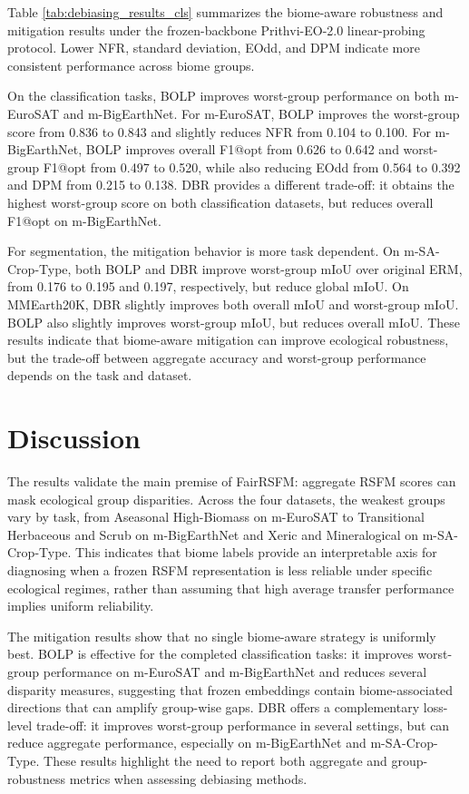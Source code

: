 \documentclass[10pt,twocolumn,letterpaper]{article}
\newcommand{\method}{FairRSFM\xspace}
\begin{document}
Table \ref{tab:debiasing_results_cls} summarizes the biome-aware robustness and mitigation results under the frozen-backbone Prithvi-EO-2.0 linear-probing protocol. Lower NFR, standard deviation, EOdd, and DPM indicate more consistent performance across biome groups.


On the classification tasks, BOLP improves worst-group performance on both m-EuroSAT and m-BigEarthNet. For m-EuroSAT, BOLP improves the worst-group score from 0.836 to 0.843 and slightly reduces NFR from 0.104 to 0.100. For m-BigEarthNet, BOLP improves overall F1@opt from 0.626 to 0.642 and worst-group F1@opt from 0.497 to 0.520, while also reducing EOdd from 0.564 to 0.392 and DPM from 0.215 to 0.138. DBR provides a different trade-off: it obtains the highest worst-group score on both classification datasets, but reduces overall F1@opt on m-BigEarthNet.

For segmentation, the mitigation behavior is more task dependent. On m-SA-Crop-Type, both BOLP and DBR improve worst-group mIoU over original ERM, from 0.176 to 0.195 and 0.197, respectively, but reduce global mIoU. On MMEarth20K, DBR slightly improves both overall mIoU and worst-group mIoU. BOLP also slightly improves worst-group mIoU, but reduces overall mIoU. These results indicate that biome-aware mitigation can improve ecological robustness, but the trade-off between aggregate accuracy and worst-group performance depends on the task and dataset.

\section{Discussion}

The results validate the main premise of \method: aggregate RSFM scores can mask ecological group disparities. Across the four datasets, the weakest groups vary by task, from Aseasonal High-Biomass on m-EuroSAT to Transitional Herbaceous and Scrub on m-BigEarthNet and Xeric and Mineralogical on m-SA-Crop-Type. This indicates that biome labels provide an interpretable axis for diagnosing when a frozen RSFM representation is less reliable under specific ecological regimes, rather than assuming that high average transfer performance implies uniform reliability.

The mitigation results show that no single biome-aware strategy is uniformly best. BOLP is effective for the completed classification tasks: it improves worst-group performance on m-EuroSAT and m-BigEarthNet and reduces several disparity measures, suggesting that frozen embeddings contain biome-associated directions that can amplify group-wise gaps. DBR offers a complementary loss-level trade-off: it improves worst-group performance in several settings, but can reduce aggregate performance, especially on m-BigEarthNet and m-SA-Crop-Type. These results highlight the need to report both aggregate and group-robustness metrics when assessing debiasing methods.
\end{document}
